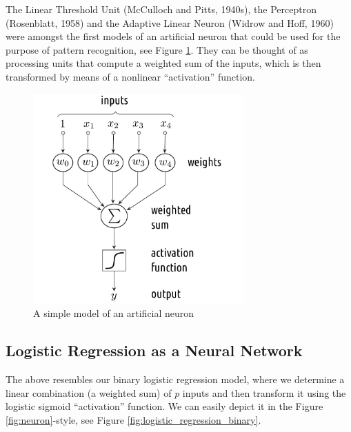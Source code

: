 \documentclass[10pt,b5paper,krantz1]{krantz}
\begin{document}
The Linear Threshold Unit (McCulloch and Pitts, 1940s),
the Perceptron (Rosenblatt, 1958) and the Adaptive Linear Neuron
(Widrow and Hoff, 1960) were amongst the first
models of an artificial neuron that could be used
for the purpose of pattern recognition, see Figure \ref{fig:perceptron}.
They can be thought of as processing units that compute
a weighted sum of the inputs,
which is then transformed by means of a nonlinear ``activation'' function.

\begin{figure}
\hypertarget{fig:perceptron}{%
\centering
\includegraphics[width=0.72\textwidth,height=\textheight]{figures/perceptron.pdf}
\caption{A simple model of an artificial neuron}\label{fig:perceptron}
}
\end{figure}

\hypertarget{logistic-regression-as-a-neural-network}{%
\subsection{Logistic Regression as a Neural Network}\label{logistic-regression-as-a-neural-network}}

The above resembles our binary logistic regression model,
where we determine a linear combination (a weighted sum) of \(p\) inputs
and then transform it using the logistic sigmoid ``activation'' function.
We can easily depict it in the Figure \ref{fig:neuron}-style,
see Figure \ref{fig:logistic_regression_binary}.
\end{document}
